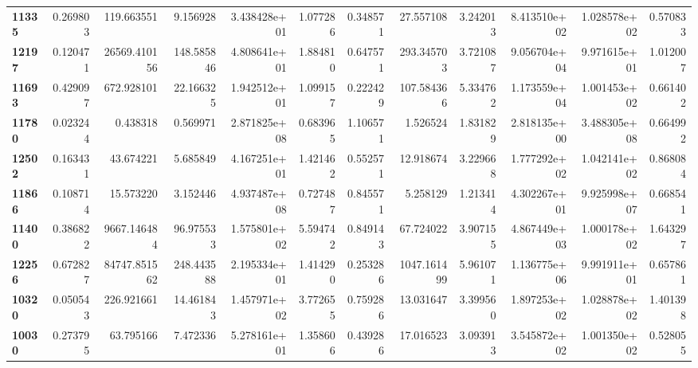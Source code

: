 \begin{table}[h]
\begin{tabular}{lrrrrrrrrrrr}
\textbf{11335} &  0.269803 &     119.663551 &        9.156928 &               3.438428e+01 &  1.077286 &  0.348571 &    27.557108 &   3.242013 &  8.413510e+02 &  1.028578e+02 &     0.570833 \\
\textbf{12197} &  0.120471 &   26569.410156 &      148.585846 &               4.808641e+01 &  1.884810 &  0.647571 &   293.345703 &   3.721087 &  9.056704e+04 &  9.971615e+01 &     1.012007 \\
\textbf{11693} &  0.429097 &     672.928101 &       22.166325 &               1.942512e+01 &  1.099157 &  0.222429 &   107.584366 &   5.334762 &  1.173559e+04 &  1.001453e+02 &     0.661402 \\
\textbf{11780} &  0.023244 &       0.438318 &        0.569971 &               2.871825e+08 &  0.683965 &  1.106571 &     1.526524 &   1.831829 &  2.818135e+00 &  3.488305e+08 &     0.664992 \\
\textbf{12502} &  0.163431 &      43.674221 &        5.685849 &               4.167251e+01 &  1.421462 &  0.552571 &    12.918674 &   3.229668 &  1.777292e+02 &  1.042141e+02 &     0.868084 \\
\textbf{11866} &  0.108714 &      15.573220 &        3.152446 &               4.937487e+08 &  0.727487 &  0.845571 &     5.258129 &   1.213414 &  4.302267e+01 &  9.925998e+07 &     0.668541 \\
\textbf{11400} &  0.386822 &    9667.146484 &       96.975533 &               1.575801e+02 &  5.594742 &  0.849143 &    67.724022 &   3.907155 &  4.867449e+03 &  1.000178e+02 &     1.643297 \\
\textbf{12256} &  0.672827 &   84747.851562 &      248.443588 &               2.195334e+01 &  1.414290 &  0.253286 &  1047.161499 &   5.961071 &  1.136775e+06 &  9.991911e+01 &     0.657861 \\
\textbf{10320} &  0.050543 &     226.921661 &       14.461843 &               1.457971e+02 &  3.772655 &  0.759286 &    13.031647 &   3.399560 &  1.897253e+02 &  1.028878e+02 &     1.401398 \\
\textbf{10030} &  0.273795 &      63.795166 &        7.472336 &               5.278161e+01 &  1.358606 &  0.439286 &    17.016523 &   3.093913 &  3.545872e+02 &  1.001350e+02 &     0.528055 \\
\bottomrule
\end{tabular}
\end{table}
